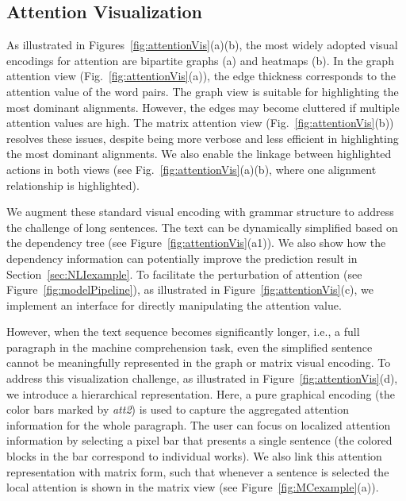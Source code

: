 \subsection{Attention Visualization}
As illustrated in Figures~\ref{fig:attentionVis}(a)(b), the most widely adopted visual encodings for attention are  bipartite graphs (a) and heatmaps (b). 
%
In the graph attention view (Fig.~\ref{fig:attentionVis}(a)), the edge thickness corresponds to the attention value of the word pairs. %
The graph view is suitable for highlighting the most dominant alignments. However, the edges may become cluttered if multiple attention values are high. 
The matrix attention view (Fig.~\ref{fig:attentionVis}(b)) resolves these issues, despite being more verbose and less efficient in highlighting the most dominant alignments. 
We also enable the linkage between highlighted actions in both views (see Fig.~\ref{fig:attentionVis}(a)(b), where one alignment relationship is highlighted).

We augment these standard visual encoding with grammar structure to address the challenge of long sentences.
The text can be dynamically simplified based on the dependency tree (see Figure~\ref{fig:attentionVis}(a1)). We also show how the dependency information can potentially improve the prediction result in Section~\ref{sec:NLIexample}.
%
To facilitate the perturbation of attention (see Figure~\ref{fig:modelPipeline}), as illustrated in Figure~\ref{fig:attentionVis}(c), we implement an interface for directly manipulating the attention value.

However, when the text sequence becomes significantly longer, i.e., a full paragraph in the machine comprehension task,  even the simplified sentence cannot be meaningfully represented in the graph or matrix visual encoding. To address this visualization challenge, as illustrated in Figure~\ref{fig:attentionVis}(d), we introduce a hierarchical representation. Here, a pure graphical encoding (the color bars marked by \emph{att2}) is used to capture the aggregated attention information for the whole paragraph. The user can focus on localized attention information by selecting a pixel bar that presents a single sentence (the colored blocks in the bar correspond to individual works). We also link this attention representation with matrix form, such that whenever a sentence is selected the local attention is shown in the matrix view (see Figure~\ref{fig:MCexample}(a)).


